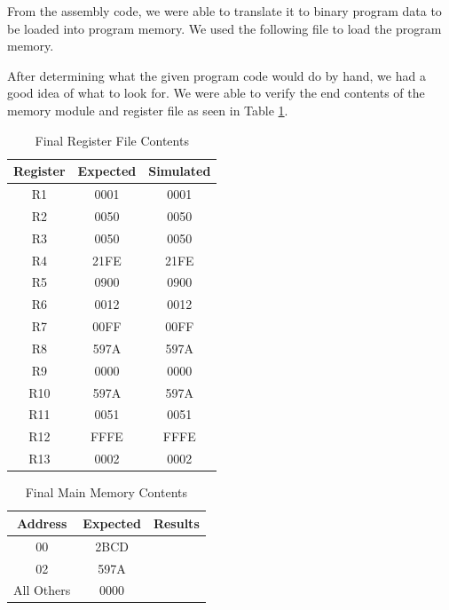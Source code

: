     From the assembly code, we were able to translate it to binary program data to be loaded into program memory. We used the following file to load the program memory.
    
    
    After determining what the given program code would do by hand, we had a good idea of what to look for. We were able to verify the end contents of the memory module and register file as seen in Table \ref{results}.
    
    
	\begin{table}[htbp]
		   \caption{Final Register File Contents}
		   \label{results}
		   \centering
		   \begin{tabular}{ c | c | c}
		   Register         & Expected & Simulated   \\
		   \hline
		   R1  &   0001     &   0001        \\
	       R2  &   0050     &   0050        \\
	       R3  &   0050     &   0050        \\
	       R4  &   21FE     &   21FE        \\
	       R5  &   0900     &   0900        \\
	       R6  &   0012     &   0012        \\
	       R7  &   00FF     &   00FF        \\
	       R8  &   597A     &   597A        \\
	       R9  &   0000     &   0000        \\
	       R10 &   597A     &   597A        \\
	       R11 &   0051     &   0051        \\
	       R12 &   FFFE     &   FFFE        \\
	       R13 &   0002     &   0002        \\
		   \end{tabular}
		\end{table}
	    \begin{table}[htbp]
	       \caption{Final Main Memory Contents}
	       \label{fmainme}
	       \centering
	       \begin{tabular}{ c | c | c }
	       Address         & Expected & Results    \\
	       \hline
	       00  &   2BCD            \\
           02  &   597A            \\
	       All Others  &   0000    \\
	       \end{tabular}
	    \end{table}

